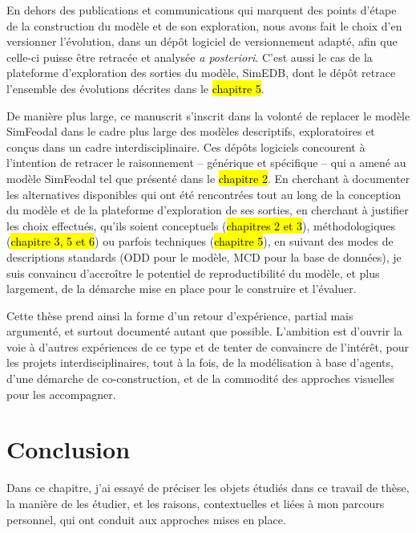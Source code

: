 En dehors des publications et communications qui marquent des \og points d'étape\fg{} de la construction du modèle et de son exploration, nous avons fait le choix d'en \og versionner\fg{} l'évolution, dans un dépôt logiciel de versionnement adapté, afin que celle-ci puisse être retracée et analysée \textit{a posteriori}.
C'est aussi le cas de la plateforme d'exploration des sorties du modèle, SimEDB, dont le dépôt retrace l'ensemble des évolutions décrites dans le \hl{chapitre 5}.

De manière plus large, ce manuscrit s'inscrit dans la volonté de replacer le modèle SimFeodal dans le cadre plus large des modèles descriptifs, exploratoires et conçus dans un cadre interdisciplinaire.
Ces dépôts logiciels concourent à l'intention de retracer le raisonnement -- générique et spécifique -- qui a amené au modèle SimFeodal tel que présenté dans le \hl{chapitre 2}.
En cherchant à documenter les alternatives disponibles qui ont été rencontrées tout au long de la conception du modèle et de la plateforme d'exploration de ses sorties, en cherchant à justifier les choix effectués, qu'ils soient conceptuels (\hl{chapitres 2 et 3}), méthodologiques (\hl{chapitre 3, 5 et 6}) ou parfois techniques (\hl{chapitre 5}), en suivant des modes de descriptions standards (ODD pour le modèle, MCD pour la base de données), je suis convaincu d'accroître le potentiel de reproductibilité du modèle, et plus largement, de la démarche mise en place pour le construire et l'évaluer.

Cette thèse prend ainsi la forme d'un retour d'expérience, partial mais argumenté, et surtout documenté autant que possible.
L'ambition est d'ouvrir la voie à d'autres expériences de ce type et de tenter de convaincre de l'intérêt, pour les projets interdisciplinaires, tout à la fois, de la modélisation à base d'agents, d'une démarche de co-construction, et de la commodité des approches visuelles pour les accompagner.


\section*{Conclusion}

Dans ce chapitre, j'ai essayé de préciser les objets étudiés dans ce travail de thèse, la manière de les étudier, et les raisons, contextuelles et liées à mon parcours personnel, qui ont conduit aux approches mises en place.

